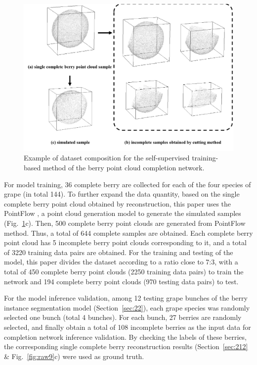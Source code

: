 \documentclass[12pt]{article}
\begin{document}
\begin{figure}[hbt!]
    \centering
    \includegraphics[width=1\textwidth]{figures/Figure9.pdf}
    \caption{Example of dataset composition for the self-supervised training-based method of the berry point cloud completion network.}
    \label{fig:raw12}
\end{figure}

For model training, 36 complete berry are collected for each of the four species of grape (in total 144). 
To further expand the data quantity, based on the single complete berry point cloud obtained by reconstruction, this paper uses the PointFlow \citep{yang_pointflow_2019}, a point cloud generation model to generate the simulated samples (Fig.~\ref{fig:raw12}c). 
Then, 500 complete berry point clouds are generated from PointFlow method. 
Thus, a total of 644 complete samples are obtained. 
Each complete berry point cloud has 5 incomplete berry point clouds corresponding to it, and a total of 3220 training data pairs are obtained. 
For the training and testing of the model, this paper divides the dataset according to a ratio close to 7:3, with a total of 450 complete berry point clouds (2250 training data pairs) to train the network and 194 complete berry point clouds (970 testing data pairs) to test.

For the model inference validation, among 12 testing grape bunches of the berry instance segmentation model (Section~\ref{sec:22}), each grape species was randomly selected one bunch (total 4 bunches). 
For each bunch, 27 berries are randomly selected, and finally obtain a total of 108 incomplete berries as the input data for completion network inference validation. 
By checking the labels of these berries, the corresponding single complete berry reconstruction results (Section~\ref{sec:212} \& Fig.~\ref{fig:raw9}c) were used as ground truth.
\end{document}
